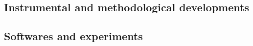 \documentclass[version=last, pagesize, twoside=semi, DIV=calc, 12pt, a4paper, french, english, bibliography=totoc]{scrartcl}
\begin{document}
%
%
%
%
%
%
%
%
%
%
%
%
%
%
%
%
%
%
%
%
%



\subsection{Instrumental and  methodological developments}


\subsection{Softwares and experiments}
\end{document}
